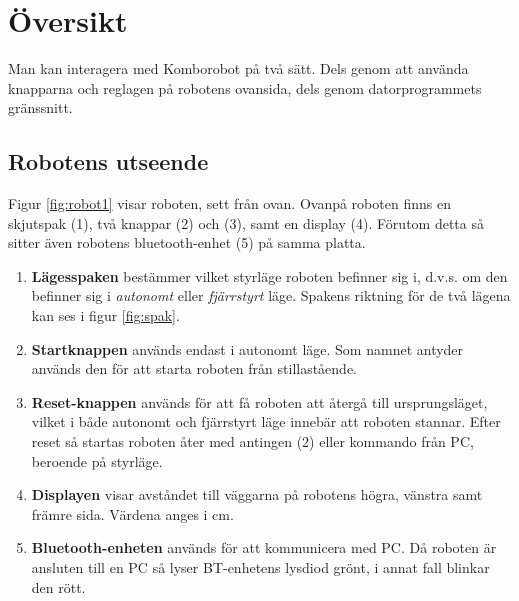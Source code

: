 
%
%


\section{Översikt}

Man kan interagera med Komborobot på två sätt. Dels genom att använda knapparna och reglagen på robotens ovansida, dels genom datorprogrammets gränssnitt. 

\subsection{Robotens utseende}

Figur \ref{fig:robot1} visar roboten, sett från ovan. Ovanpå roboten finns en
skjutspak (1), två knappar (2) och (3),  samt en display (4).   Förutom detta så sitter även robotens bluetooth-enhet (5) på samma platta. 


\begin{enumerate}
\item{\bf Lägesspaken} bestämmer vilket styrläge roboten befinner sig i, d.v.s. om den befinner sig i \emph{autonomt} eller \emph{fjärrstyrt} läge. Spakens riktning för de två lägena kan ses i figur \ref{fig:spak}.
\item {\bf Startknappen} används endast i autonomt läge. Som namnet antyder används den för att starta roboten från stillastående. 
\item{\bf Reset-knappen} används för att få roboten att återgå till ursprungsläget, vilket i både autonomt och fjärrstyrt läge innebär att roboten stannar. Efter reset så startas roboten åter med antingen (2) eller kommando från PC, beroende på styrläge.
\item{\bf Displayen} visar avståndet till väggarna på robotens högra, vänstra samt främre sida. Värdena anges i cm. 
\item{\bf Bluetooth-enheten} används för att kommunicera med PC. Då roboten är ansluten till en PC så lyser BT-enhetens lysdiod grönt, i annat fall blinkar den rött. 
\end{enumerate}

